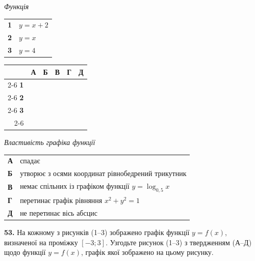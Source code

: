 \documentclass[14pt]{extarticle}
\newcommand{\answerGrid}{
    \begingroup
    \renewcommand{\arraystretch}{1.3} 
    \setlength{\tabcolsep}{7pt} 
    \begin{tabular}{r|c|c|c|c|c|}
         \multicolumn{1}{c}{} & \multicolumn{1}{c}{\textbf{А}} & \multicolumn{1}{c}{\textbf{Б}} & \multicolumn{1}{c}{\textbf{В}} & \multicolumn{1}{c}{\textbf{Г}} & \multicolumn{1}{c}{\textbf{Д}} \\ \cline{2-6}
         \textbf{1} & & & & & \\ \cline{2-6}
         \textbf{2} & & & & & \\ \cline{2-6}
         \textbf{3} & & & & & \\ \cline{2-6}
    \end{tabular}
    \endgroup
}
\begin{document}
\noindent
\begin{minipage}[t]{0.45\textwidth}
    \textit{Функція} \par \vspace{0.2cm}
    \begin{tabular}{@{}p{0.5cm} l@{}}
    \textbf{1} & $y=x+2$ \\[0.4cm]
    \textbf{2} & $y=x$ \\[0.4cm]
    \textbf{3} & $y=4$ \\
    \end{tabular}

    \vspace{1.0cm}
    \answerGrid
\end{minipage}%
\hfill
\begin{minipage}[t]{0.50\textwidth}
    \textit{Властивість графіка функції} \par \vspace{0.2cm}
    \begin{tabular}{@{}p{0.5cm} p{7cm}@{}}
    \textbf{А} & спадає \\[0.2cm]
    \textbf{Б} & утворює з осями координат рівнобедрений трикутник \\[0.2cm]
    \textbf{В} & немає спільних із графіком функції $y=\log_{0{,}5} x$ \\[0.2cm]
    \textbf{Г} & перетинає графік рівняння $x^2 + y^2 = 1$ \\[0.2cm]
    \textbf{Д} & не перетинає вісь абсцис \\
    \end{tabular}
\end{minipage}

\vspace{0.7cm}
\noindent\textbf{53.} На кожному з рисунків (1--3) зображено графік функції $y=f(x)$, визначеної на проміжку $[-3; 3]$. Узгодьте рисунок (1--3) з твердженням (А--Д) щодо функції $y=f(x)$, графік якої зображено на цьому рисунку.

\vspace{0.3cm}
\end{document}
